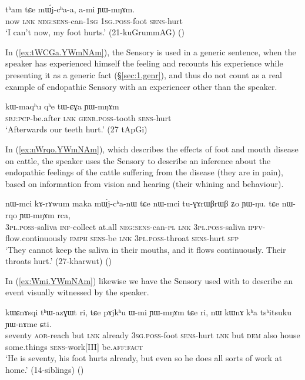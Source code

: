 \begin{exe}
\ex \label{ex:YWmNAm}
\gll tʰam tɕe mɯ́j-cʰa-a, a-mi ɲɯ-mŋɤm. \\
now \textsc{lnk} \textsc{neg}:\textsc{sens}-can-\textsc{1sg} \textsc{1sg}.\textsc{poss}-foot \textsc{sens}-hurt \\
\glt `I can't now, my foot hurts.' (21-kuGrummAG)
()
\end{exe}


In (\ref{ex:tWCGa.YWmNAm}), the Sensory is used in a generic sentence, when the speaker has experienced himself the feeling and recounts his experience while presenting it as a generic fact (§\ref{sec:1.genr}), and thus do not count as a real example of endopathic Sensory with an experiencer other than the speaker.

\begin{exe}
\ex \label{ex:tWCGa.YWmNAm}
\gll kɯ-maqʰu qʰe tɯ-ɕɣa ɲɯ-mŋɤm \\
\textsc{sbj}:\textsc{pcp}-be.after \textsc{lnk} \textsc{genr}.\textsc{poss}-tooth \textsc{sens}-hurt \\
\glt `Afterwards our teeth hurt.' (27 tApGi)
\end{exe}

In (\ref{ex:nWrqo.YWmNAm}), which describes the effects of foot and mouth disease on cattle, the speaker uses the Sensory to describe an inference about the endopathic feelings of the cattle suffering from the disease (they are in pain), based on information from vision and hearing (their whining and behaviour).

\begin{exe}
\ex \label{ex:nWrqo.YWmNAm}
\gll nɯ-mci kɤ-rɤwum maka mɯ́j-cʰa-nɯ tɕe nɯ-mci tu-ɣɤrɯβrɯβ ʑo ɲɯ-ŋu. tɕe nɯ-rqo ɲɯ-mŋɤm rca, \\
\textsc{3pl}.\textsc{poss}-saliva \textsc{inf}-collect at.all \textsc{neg}:\textsc{sens}-can-\textsc{pl} \textsc{lnk} \textsc{3pl}.\textsc{poss}-saliva \textsc{ipfv}-flow.continuously \textsc{emph} \textsc{sens}-be \textsc{lnk} \textsc{3pl}.\textsc{poss}-throat \textsc{sens}-hurt \textsc{sfp} \\
\glt `They cannot keep the saliva in their mouths, and it flows continuously. Their throats hurt.' (27-kharwut)
()
\end{exe}

In (\ref{ex:Wmi.YWmNAm}) likewise we have the Sensory used with  to describe an event visually witnessed by the speaker.

\begin{exe}
\ex \label{ex:Wmi.YWmNAm}
\gll kɯɕnɤsqi tʰɯ-azɣɯt ri, tɕe pɤjkʰu ɯ-mi ɲɯ-mŋɤm tɕe ri, nɯ kɯnɤ kʰa tsʰitsuku ɲɯ-nɤme ɕti. \\
seventy \textsc{aor}-reach but \textsc{lnk} already \textsc{3sg}.\textsc{poss}-foot \textsc{sens}-hurt \textsc{lnk} but \textsc{dem} also house some.things \textsc{sens}-work[III] be.\textsc{aff}:\textsc{fact} \\
\glt `He is seventy, his foot hurts already, but even so he does all sorts of work at home.' (14-siblings)
()
\end{exe}
 
